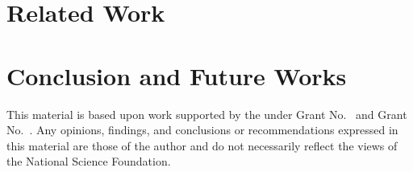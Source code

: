 \documentclass[manuscript,acmsmall,anonymous,review,screen,nonacm=true, authorversion=true]{acmart}
\begin{document}
\section{Related Work}
\label{sec:relatedwork}

%
\section{Conclusion and Future Works}
\label{sec:conlusion}





\begin{acks}
This material is based upon work supported by the
 under Grant
No.~ and Grant
No.~.  Any opinions, findings, and
conclusions or recommendations expressed in this material are those
of the author and do not necessarily reflect the views of the
National Science Foundation.
\end{acks}






% 
\end{document}
